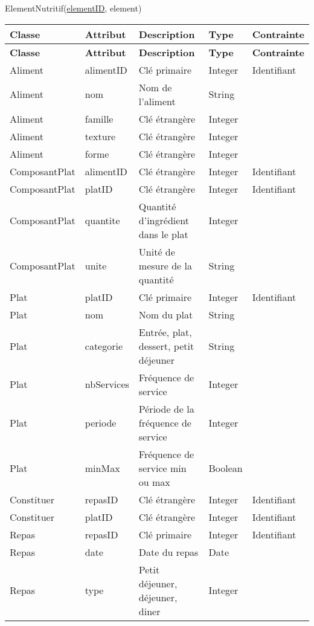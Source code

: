 ElementNutritif(\underline{elementID}, element)


\begin{longtable}{llp{5cm}ll}
  \hline
  \textbf{Classe} & \textbf{Attribut} & \textbf{Description} & \textbf{Type} & \textbf{Contrainte} \\ \endfirsthead \hline
  \textbf{Classe} & \textbf{Attribut} & \textbf{Description} & \textbf{Type} & \textbf{Contrainte} \\ \endhead \hline
  Aliment & alimentID & Clé primaire & Integer & Identifiant \\
  Aliment & nom & Nom de l'aliment & String & \\
  Aliment & famille & Clé étrangère & Integer & \\
  Aliment & texture & Clé étrangère & Integer & \\
  Aliment & forme & Clé étrangère & Integer & \\ \hline
  ComposantPlat & alimentID & Clé étrangère & Integer & Identifiant \\
  ComposantPlat & platID & Clé étrangère & Integer & Identifiant \\
  ComposantPlat & quantite & Quantité d'ingrédient dans le plat & Integer & \\
  ComposantPlat & unite & Unité de mesure de la quantité & String & \\ \hline
  Plat & platID & Clé primaire & Integer & Identifiant \\
  Plat & nom & Nom du plat & String & \\
  Plat & categorie & Entrée, plat, dessert, petit déjeuner & String & \\
  Plat & nbServices & Fréquence de service & Integer & \\
  Plat & periode & Période de la fréquence de service & Integer & \\
  Plat & minMax & Fréquence de service min ou max & Boolean & \\ \hline
  Constituer & repasID & Clé étrangère & Integer & Identifiant \\
  Constituer & platID & Clé étrangère & Integer & Identifiant \\ \hline
  Repas & repasID & Clé primaire & Integer & Identifiant \\
  Repas & date & Date du repas & Date &  \\
  Repas & type & Petit déjeuner, déjeuner, diner & Integer \\

\end{longtable}
